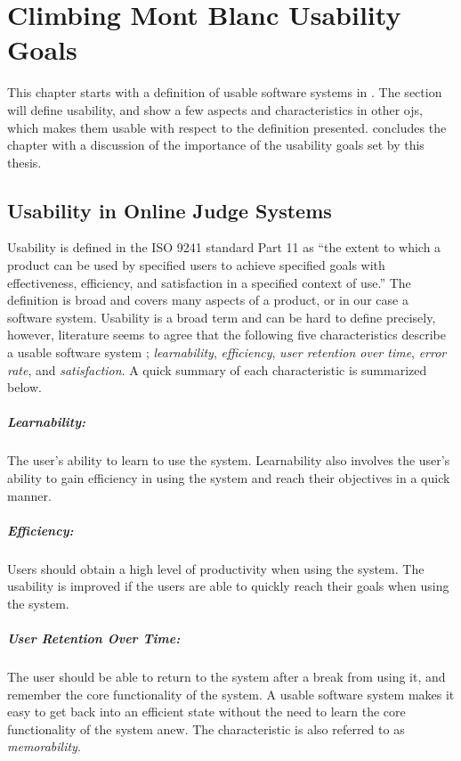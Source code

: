 \chapter{Climbing Mont Blanc Usability Goals}
\label{ch:design}
This chapter starts with a definition of usable software systems in . The section will define usability, and show a few aspects and characteristics in other \glspl{oj}, which makes them usable with respect to the definition presented.  concludes the chapter with a discussion of the importance of the usability goals set by this thesis.

\section{Usability in Online Judge Systems}
\label{sec:usability-def}
Usability is defined in the ISO 9241 standard Part 11 \cite{ISO1998} as ``the extent to which a product can be used by specified users to achieve specified goals with effectiveness, efficiency, and satisfaction in a specified context of use.'' The definition is broad and covers many aspects of a product, or in our case a software system. Usability is a broad term and can be hard to define precisely, however, literature seems to agree that the following five characteristics describe a usable software system  \cite{holzinger2005, ferre2001}; \textit{learnability}, \textit{efficiency}, \textit{user retention over time}, \textit{error rate}, and \textit{satisfaction}. A quick summary of each characteristic is summarized below.

\paragraph*{Learnability:} The user's ability to learn to use the system. Learnability also involves the user's ability to gain efficiency in using the system and reach their objectives in a quick manner.

\paragraph*{Efficiency:} Users should obtain a high level of productivity when using the system. The usability is improved if the users are able to quickly reach their goals when using the system.

\paragraph*{User Retention Over Time:} The user should be able to return to the system after a break from using it, and remember the core functionality of the system. A usable software system makes it easy to get back into an efficient state without the need to learn the core functionality of the system anew. The characteristic is also referred to as \textit{memorability}.

